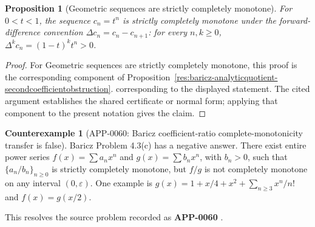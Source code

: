 \documentclass[11pt]{article}
\numberwithin{equation}{section}
\newtheorem{proposition}[theorem]{Proposition}
\theoremstyle{definition}
\newtheorem{counterexample}[theorem]{Counterexample}
\theoremstyle{remark}
\newcommand{\1}{\mathbf 1}
\begin{document}
\begin{proposition}[Geometric sequences are strictly completely monotone]
\label{res:baricz-geometricsequence-strictcm}
For \(0<t<1\), the sequence \(c_n=t^n\) is strictly completely monotone under the forward-difference convention \(\Delta c_n=c_n-c_{n+1}\): for every \(n,k\ge0\), \(\Delta^kc_n=(1-t)^kt^n>0\).
\end{proposition}

\begin{proof}
For Geometric sequences are strictly completely monotone, this proof is the corresponding component of Proposition~\ref{res:baricz-analyticquotient-secondcoefficientobstruction}.  corresponding to the displayed statement.  The cited argument establishes the shared certificate or normal form; applying that component to the present notation gives the claim.
\end{proof}

\begin{counterexample}[APP-0060: Baricz coefficient-ratio complete-monotonicity transfer is false]
\label{res:baricz-coefficientratio-cmtransfer-counterexample}
Baricz Problem 4.3(c) has a negative answer. There exist entire power series \(f(x)=\sum a_nx^n\) and \(g(x)=\sum b_nx^n\), with \(b_n>0\), such that \(\{a_n/b_n\}_{n\ge0}\) is strictly completely monotone, but \(f/g\) is not completely monotone on any interval \((0,\varepsilon)\). One example is \(g(x)=1+x/4+x^2+\sum_{n\ge3}x^n/n!\) and \(f(x)=g(x/2)\).



This resolves the source problem recorded as \textbf{APP-0060} \cite{app-app-0060-source}.
\end{counterexample}
\end{document}
